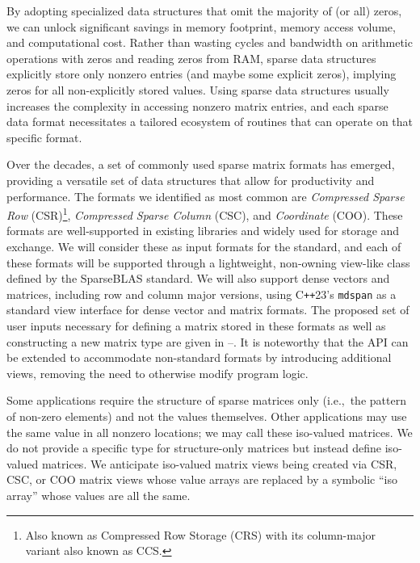 \documentclass[manuscript,review]{acmart}
\newcommand{\cppstd}[1]{C\texttt{++}#1\xspace}
\begin{document}
By adopting specialized data structures that omit the majority of (or all) zeros, we can unlock significant savings in memory footprint, memory access volume, and computational cost. Rather than wasting cycles and bandwidth on arithmetic operations with zeros and reading zeros from RAM, sparse data structures explicitly store only nonzero entries (and maybe some explicit zeros), implying zeros for all non-explicitly stored values. Using sparse data structures usually increases the complexity in accessing nonzero matrix entries, and each sparse data format necessitates a tailored ecosystem of routines that can operate on that specific format.

Over the decades, a set of commonly used sparse matrix formats has emerged, providing a versatile set of data structures that allow for productivity and performance. The formats we identified as most common are \textit{Compressed Sparse Row} (CSR)\footnote{Also known as Compressed Row Storage (CRS) with its column-major variant also known as CCS.}, \textit{Compressed Sparse Column} (CSC), and \textit{Coordinate} (COO).
These formats are well-supported in existing libraries and widely used
for storage and exchange. We will consider these as input formats for
the standard, and each of these formats will be supported through a lightweight, non-owning view-like class defined by the SparseBLAS standard. We will also support dense vectors and matrices, including row and column major versions, using \cppstd{23}'s \texttt{mdspan} as a standard view interface for dense vector and matrix formats. The proposed set of user inputs necessary for defining a matrix stored in these formats as well as constructing a new matrix type are given in --. It is noteworthy that the API can be extended to accommodate non-standard formats by introducing additional views, removing the need to otherwise modify program logic.



Some applications require the structure of sparse matrices only (i.e.,~the pattern of non-zero elements) and not the values themselves. Other applications may use the same value in all nonzero locations; we may call these iso-valued matrices. We do not provide a specific type for structure-only matrices but instead define iso-valued matrices.  We anticipate iso-valued matrix views being created via CSR, CSC, or COO matrix views whose value arrays are replaced by a symbolic ``iso array'' whose values are all the same.
\end{document}
